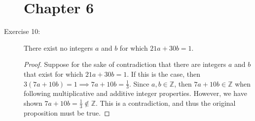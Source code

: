 \documentclass[12pt]{article}
\begin{document}
\begin{description}
\section*{Chapter 6}
\item[Exercise 10:] There exist no integers $a$ and $b$ for which $21a+30b=1$.
\begin{spacing}{2}
\begin{proof}
Suppose for the sake of contradiction that there are integers $a$ and $b$ that exist for which $21a+30b=1$. If this is the case, then $3(7a+10b)=1 \implies 7a + 10b = \frac{1}{3}$. Since $a,b \in \mathbb{Z}$, then $7a+10b \in \mathbb{Z}$ when following multiplicative and additive integer properties. However, we have shown $7a + 10b = \frac{1}{3} \notin \mathbb{Z}$. This is a contradiction, and thus the original proposition must be true.
\end{proof}
\end{spacing} 
\end{description}
%
\newpage
{}
%
\end{document}
